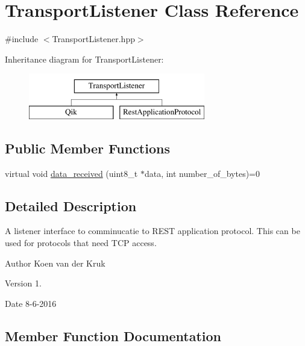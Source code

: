 \hypertarget{class_transport_listener}{}\section{Transport\+Listener Class Reference}
\label{class_transport_listener}


{\ttfamily \#include $<$Transport\+Listener.\+hpp$>$}

Inheritance diagram for Transport\+Listener\+:\begin{figure}[H]
\begin{center}
\leavevmode
\includegraphics[height=2.000000cm]{class_transport_listener}
\end{center}
\end{figure}
\subsection*{Public Member Functions}
\begin{DoxyCompactItemize}
\item 
virtual void \hyperlink{class_transport_listener_aafc4dd15ef03baa68b36b45c43c5addd}{data\+\_\+received} (uint8\+\_\+t $\ast$data, int number\+\_\+of\+\_\+bytes)=0
\end{DoxyCompactItemize}


\subsection{Detailed Description}
A listener interface to comminucatie to R\+E\+S\+T application protocol. This can be used for protocols that need T\+C\+P access. \begin{DoxyAuthor}{Author}
Koen van der Kruk 
\end{DoxyAuthor}
\begin{DoxyVersion}{Version}
1. 
\end{DoxyVersion}
\begin{DoxyDate}{Date}
8-\/6-\/2016 
\end{DoxyDate}


\subsection{Member Function Documentation}
\hypertarget{class_transport_listener_aafc4dd15ef03baa68b36b45c43c5addd}{}
